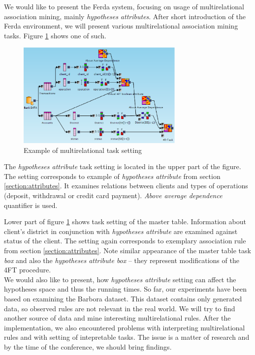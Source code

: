 \documentclass[conference]{IEEEtran}
\begin{document}
We would like to present the Ferda system, focusing on usage of multirelational 
association mining, mainly \emph{hypotheses attributes}. After short introduction 
of the Ferda environment, we will present various multirelational association
mining tasks. Figure \ref{fig:example} shows one of such. 

\begin{figure}[!t]
\centering
\includegraphics[width=3.2in]{Example.eps}
\caption{Example of multirelational task setting}
\label{fig:example}
\end{figure}

The \emph{hypotheses attribute} task setting is located in the upper part of the 
figure. The setting corresponds to example of \emph{hypotheses attribute} from section 
\ref{section:attributes}. It examines relations between clients and types of operations (deposit, withdrawal or credit card payment). \emph{Above average dependence} quantifier
is used. 

Lower part of figure \ref{fig:example} shows task setting of the master table. Information
about client's district in conjunction with \emph{hypotheses attribute} are examined 
against status of the client. The setting again corresponds to exemplary association 
rule from section \ref{section:attributes}. Note similar appearance of the master 
table task \emph{box} and also the \emph{hypotheses attribute box} -- they represent 
modifications of the 4FT procedure.
$$$$
We would also like to present, how \emph{hypotheses attribute} setting can affect
the hypotheses space and thus the running times. So far, our experiments have been
based on examining the Barbora dataset. This dataset contains only generated data, 
so observed rules are not relevant in the real world. We will try to find another
source of data and mine interesting multirelational rules. After the implementation,
we also encountered problems with interpreting multirelational rules and with 
setting of intepretable tasks. The issue is a matter of research and by the time 
of the conference, we should bring findings. 
\end{document}
